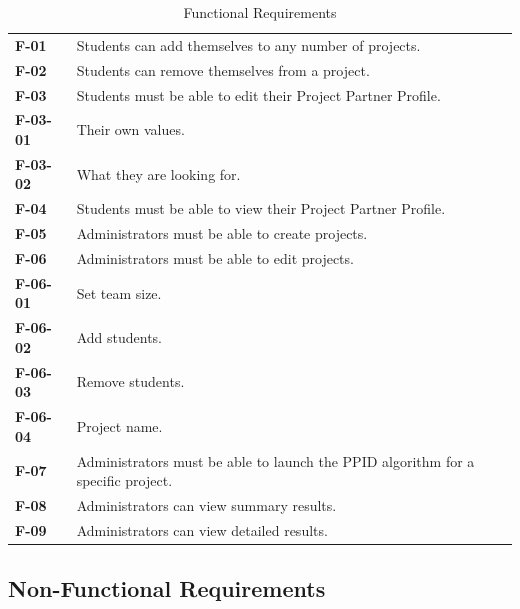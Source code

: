 \documentclass[12pt,letterpaper]{article}
\begin{document}
\begin{table}[H]
\caption{Functional Requirements}
\renewcommand{\arraystretch}{1.5}
\everyrow{\hline}
\begin{tabu} to 
F-01 & Students can add themselves to any number of projects. \\
F-02 & Students can remove themselves from a project. \\
F-03 & Students must be able to edit their Project Partner Profile. \\
\hspace{1 pc}F-03-01 & \hspace{2 pc}Their own values. \\
\hspace{1 pc}F-03-02 & \hspace{2 pc}What they are looking for. \\
F-04 & Students must be able to view their Project Partner Profile. \\
F-05 & Administrators must be able to create projects. \\
F-06 & Administrators must be able to edit projects. \\
\hspace{1 pc}F-06-01 & \hspace{2 pc}Set team size. \\
\hspace{1 pc}F-06-02 & \hspace{2 pc}Add students. \\
\hspace{1 pc}F-06-03 & \hspace{2 pc}Remove students. \\
\hspace{1 pc}F-06-04 & \hspace{2 pc}Project name. \\
F-07 & Administrators must be able to launch the PPID algorithm for a specific project. \\
F-08 & Administrators can view summary results. \\
F-09 & Administrators can view detailed results.
\end{tabu}
\end{table}

\subsection{Non-Functional Requirements}
\end{document}

